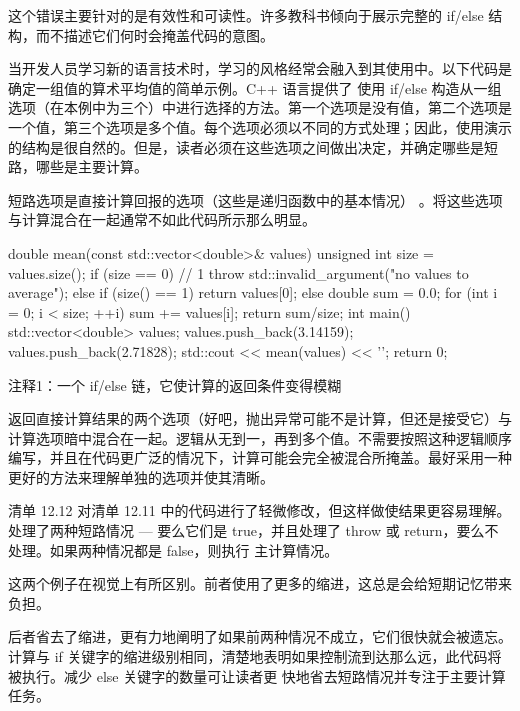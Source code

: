 这个错误主要针对的是有效性和可读性。许多教科书倾向于展示完整的 if/else 结构，而不描述它们何时会掩盖代码的意图。


当开发人员学习新的语言技术时，学习的风格经常会融入到其使用中。以下代码是确定一组值的算术平均值的简单示例。C++ 语言提供了 使用 if/else 构造从一组选项（在本例中为三个）中进行选择的方法。第一个选项是没有值，第二个选项是一个值，第三个选项是多个值。每个选项必须以不同的方式处理；因此，使用演示的结构是很自然的。但是，读者必须在这些选项之间做出决定，并确定哪些是短路，哪些是主要计算。

短路选项是直接计算回报的选项（这些是递归函数中的基本情况） 。将这些选项与计算混合在一起通常不如此代码所示那么明显。


\begin{cpp}
double mean(const std::vector<double>& values) {
  unsigned int size = values.size();
  if (size == 0) // 1
    throw std::invalid_argument("no values to average");
  else if (size() == 1)
    return values[0];
  else {
    double sum = 0.0;
    for (int i = 0; i < size; ++i)
      sum += values[i];
    return sum/size;
  }
}
int main() {
  std::vector<double> values;
  values.push_back(3.14159);
  values.push_back(2.71828);
  std::cout << mean(values) << '\n';
  return 0;
}
\end{cpp}

{\footnotesize
注释1：一个 if/else 链，它使计算的返回条件变得模糊
}


返回直接计算结果的两个选项（好吧，抛出异常可能不是计算，但还是接受它）与计算选项暗中混合在一起。逻辑从无到一，再到多个值。不需要按照这种逻辑顺序编写，并且在代码更广泛的情况下，计算可能会完全被混合所掩盖。最好采用一种更好的方法来理解单独的选项并使其清晰。


清单 12.12 对清单 12.11 中的代码进行了轻微修改，但这样做使结果更容易理解。处理了两种短路情况 — 要么它们是 true，并且处理了 throw 或 return，要么不处理。如果两种情况都是 false，则执行 主计算情况。

这两个例子在视觉上有所区别。前者使用了更多的缩进，这总是会给短期记忆带来负担。

后者省去了缩进，更有力地阐明了如果前两种情况不成立，它们很快就会被遗忘。计算与 if 关键字的缩进级别相同，清楚地表明如果控制流到达那么远，此代码将被执行。减少 else 关键字的数量可让读者更 快地省去短路情况并专注于主要计算任务。

